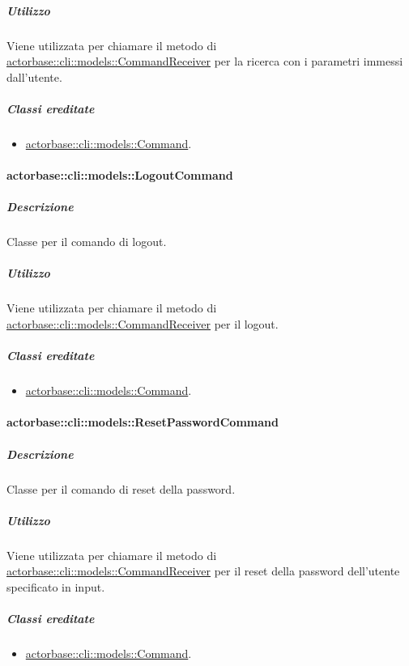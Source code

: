 \documentclass{scalatekids-article}
\begin{document}
\subparagraph{Utilizzo}

Viene utilizzata per chiamare il metodo di
\hyperref[sec:actorbase::cli::models::CommandReceiver]{actorbase::cli::models::CommandReceiver} per la ricerca con i parametri immessi
dall'utente.

\subparagraph{Classi ereditate}

\begin{itemize}
\item \hyperref[sec:actorbase::cli::models::Command]{actorbase::cli::models::Command}.
\end{itemize}

\paragraph{actorbase::cli::models::LogoutCommand}
\label{sec:actorbase::cli::models::LogoutCommand}

\subparagraph{Descrizione}

Classe per il comando di logout.

\subparagraph{Utilizzo}

Viene utilizzata per chiamare il metodo di
\hyperref[sec:actorbase::cli::models::CommandReceiver]{actorbase::cli::models::CommandReceiver} per il logout.

\subparagraph{Classi ereditate}

\begin{itemize}
\item \hyperref[sec:actorbase::cli::models::Command]{actorbase::cli::models::Command}.
\end{itemize}

\paragraph{actorbase::cli::models::ResetPasswordCommand}
\label{sec:actorbase::cli::models::ResetPasswordCommand}

\subparagraph{Descrizione}

Classe per il comando di reset della password.

\subparagraph{Utilizzo}

Viene utilizzata per chiamare il metodo di
\hyperref[sec:actorbase::cli::models::CommandReceiver]{actorbase::cli::models::CommandReceiver} per il reset della password
dell'utente specificato in input.

\subparagraph{Classi ereditate}

\begin{itemize}
\item \hyperref[sec:actorbase::cli::models::Command]{actorbase::cli::models::Command}.
\end{itemize}
\end{document}
